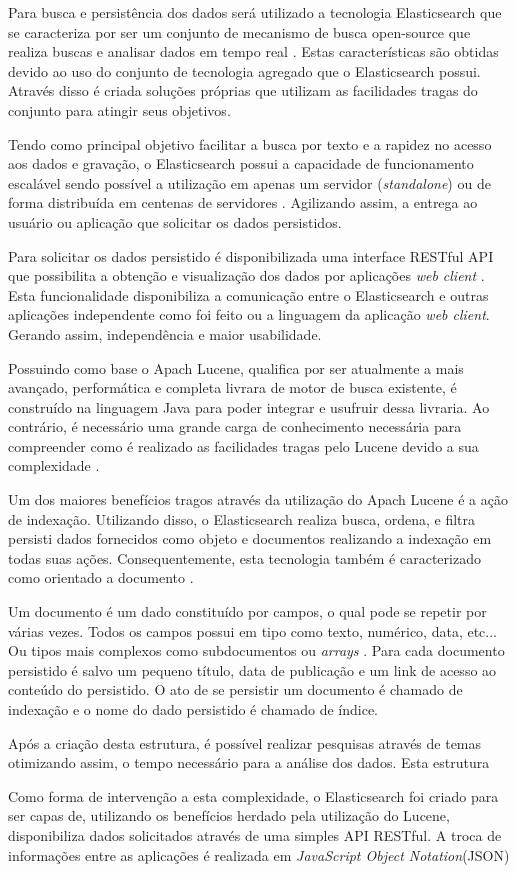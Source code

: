 Para busca e persistência dos dados será utilizado a tecnologia Elasticsearch que se caracteriza por ser um conjunto de mecanismo de busca open-source que realiza buscas e analisar dados em tempo real \cite{Gil:2010}. Estas características são obtidas devido ao uso do conjunto de tecnologia agregado que o Elasticsearch possui. Através disso é criada soluções próprias que utilizam as  facilidades tragas do conjunto para atingir seus objetivos.

Tendo como principal objetivo facilitar a busca por texto e a rapidez no acesso aos dados e gravação, o Elasticsearch possui a capacidade de funcionamento escalável sendo possível a utilização em apenas um servidor (\textit{standalone}) ou de forma distribuída em centenas de servidores \cite{Gormley:2015}. Agilizando assim, a entrega ao usuário ou aplicação que solicitar os dados persistidos.

Para solicitar os dados persistido é disponibilizada uma interface RESTful API que possibilita a obtenção e visualização dos dados por aplicações \textit{web client} \cite{Gormley:2015}. Esta funcionalidade disponibiliza a comunicação entre o Elasticsearch e outras aplicações independente como foi feito ou a linguagem da aplicação \textit{web client}. Gerando assim, independência e maior usabilidade.

Possuindo como base o Apach Lucene, qualifica por ser atualmente a mais avançado, performática e completa livrara de motor de busca existente, é construído na linguagem Java para poder integrar e usufruir dessa livraria. Ao contrário, é necessário uma grande carga de conhecimento necessária para compreender como é realizado as facilidades tragas pelo Lucene devido a sua complexidade \cite{Gormley:2015}.

Um dos maiores benefícios tragos através da utilização do Apach Lucene é a ação de indexação. Utilizando disso, o Elasticsearch realiza busca, ordena, e filtra persisti dados fornecidos como objeto e documentos realizando a indexação em todas suas ações. Consequentemente, esta tecnologia também é caracterizado como orientado a documento \cite{Gormley:2015}.

Um documento é um dado constituído por campos, o qual pode se repetir por várias vezes. Todos os campos possui em tipo como texto, numérico, data, etc... Ou tipos mais complexos como subdocumentos ou \textit{arrays} \cite{Kuc:2013}. Para cada documento persistido é salvo um pequeno título, data de publicação e um link de acesso ao conteúdo do persistido. O ato de se persistir um documento é chamado de indexação e o nome do dado persistido é chamado de índice. 

Após a criação desta estrutura, é possível realizar pesquisas através de temas otimizando assim,  o tempo necessário para a análise dos dados. Esta estrutura

Como forma de intervenção a esta complexidade, o Elasticsearch foi criado para  ser capas de, utilizando os benefícios herdado pela utilização do Lucene, disponibiliza dados solicitados através de uma simples API RESTful. A troca de informações entre as aplicações é realizada em \textit{JavaScript Object Notation}(JSON)
